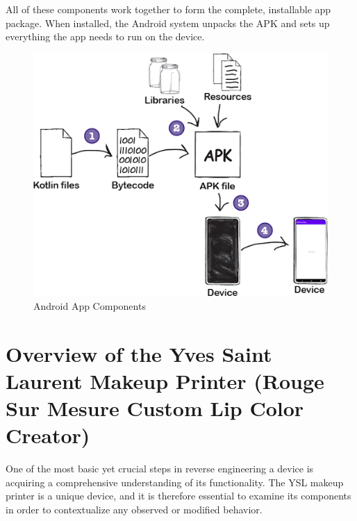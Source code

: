 All of these components work together to form the complete, installable app package. When installed, the Android system unpacks the APK and sets up everything the app needs to run on the device.
\begin{figure}[H]
	\centering
	\includegraphics[scale=.65]{apk_to_app.png}
	\caption{Android App Components}
	\label{fig:apktoapp}
\end{figure}

\section[Overview of the YSL Makeup Printer]{Overview of the Yves Saint Laurent Makeup Printer (Rouge Sur Mesure Custom Lip Color Creator)}
One of the most basic yet crucial steps in reverse engineering a device is acquiring a comprehensive understanding of its functionality. The YSL makeup printer is a unique device, and it is therefore essential to examine its components in order to contextualize any observed or modified behavior.

